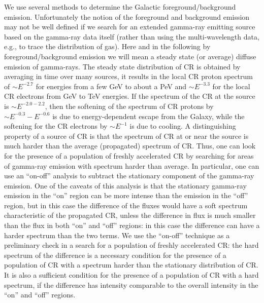 We use several methods to determine the Galactic foreground/background emission.
Unfortunately the notion of the foreground and background emission may not be well defined if we search for
an extended gamma-ray emitting source based on the gamma-ray data itself
(rather than using the multi-wavelength data, e.g., to trace the distribution of gas).
Here and in the following by foreground/background emission we will mean a steady state 
(or average) diffuse emission of gamma-rays.
The steady state distribution of CR is obtained by averaging in time over many sources, it results in the local CR proton spectrum
of $\sim E^{-2.7}$ for energies from a few GeV to about a PeV and $\sim E^{-3.3}$ for the local CR electrons from GeV to TeV energies.
If the spectrum of the CR at the source is $\sim E^{-2.0 - 2.2}$, then the softening of the spectrum of CR protons by $\sim E^{-0.3} - E^{-0.6}$ 
is due to energy-dependent escape from the Galaxy,
while the softening for the CR electrons by $\sim E^{-1}$ is due to cooling.
A distinguishing property of a source of CR is that the spectrum of CR at or near the source is much harder than the average (propagated)
spectrum of CR.
Thus, one can look for the presence of a population of freshly accelerated CR by searching for areas of gamma-ray emission
with spectrum harder than average. In particular, one can use an ``on-off'' analysis to subtract the stationary component of the gamma-ray emission.
One of the caveats of this analysis is that the stationary gamma-ray emission in the ``on'' region can be more intense than the emission in the ``off'' region,
but in this case the difference of the fluxes would have a soft spectrum characteristic of the propagated CR,
unless the difference in flux is much smaller than the flux in both ``on'' and  ``off''  regions: in this case the difference can have a harder spectrum than the two terms.
We use the ``on-off'' technique as a preliminary check in a search for a population of freshly accelerated CR:
the hard spectrum of the difference is a necessary condition for the presence of a population of CR with a spectrum harder than the stationary distribution of CR.
It is also a sufficient condition for the presence of a population of CR with a hard spectrum, if the difference
has intensity comparable to the overall intensity in the ``on'' and  ``off''  regions.

